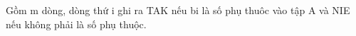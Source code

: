 Gồm m dòng, dòng thứ i ghi ra TAK nếu bi là số phụ thuôc vào tập A và NIE nếu không phải là số phụ thuộc.